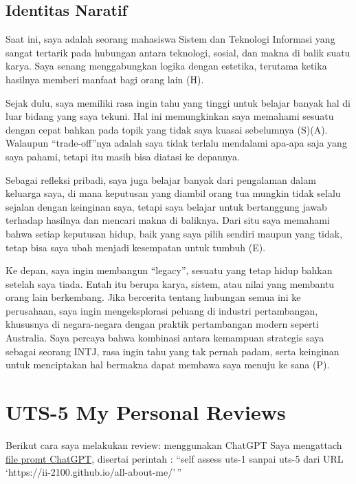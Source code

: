 \documentclass[
  letterpaper,
  DIV=11,
  numbers=noendperiod]{scrreprt}
\begin{document}
\section{Identitas Naratif}\label{identitas-naratif}

Saat ini, saya adalah seorang mahasiswa Sistem dan Teknologi Informasi
yang sangat tertarik pada hubungan antara teknologi, sosial, dan makna
di balik suatu karya. Saya senang menggabungkan logika dengan estetika,
terutama ketika hasilnya memberi manfaat bagi orang lain (H).

Sejak dulu, saya memiliki rasa ingin tahu yang tinggi untuk belajar
banyak hal di luar bidang yang saya tekuni. Hal ini memungkinkan saya
memahami sesuatu dengan cepat bahkan pada topik yang tidak saya kuasai
sebelumnya (S)(A). Walaupun ``trade-off''nya adalah saya tidak terlalu
mendalami apa-apa saja yang saya pahami, tetapi itu masih bisa diatasi
ke depannya.

Sebagai refleksi pribadi, saya juga belajar banyak dari pengalaman dalam
keluarga saya, di mana keputusan yang diambil orang tua mungkin tidak
selalu sejalan dengan keinginan saya, tetapi saya belajar untuk
bertanggung jawab terhadap hasilnya dan mencari makna di baliknya. Dari
situ saya memahami bahwa setiap keputusan hidup, baik yang saya pilih
sendiri maupun yang tidak, tetap bisa saya ubah menjadi kesempatan untuk
tumbuh (E).

Ke depan, saya ingin membangun ``legacy'', sesuatu yang tetap hidup
bahkan setelah saya tiada. Entah itu berupa karya, sistem, atau nilai
yang membantu orang lain berkembang. Jika bercerita tentang hubungan
semua ini ke perusahaan, saya ingin mengeksplorasi peluang di industri
pertambangan, khususnya di negara-negara dengan praktik pertambangan
modern seperti Australia. Saya percaya bahwa kombinasi antara kemampuan
strategis saya sebagai seorang INTJ, rasa ingin tahu yang tak pernah
padam, serta keinginan untuk menciptakan hal bermakna dapat membawa saya
menuju ke sana (P).


\chapter{UTS-5 My Personal Reviews}\label{uts-5-my-personal-reviews}

Berikut cara saya melakukan review: menggunakan ChatGPT Saya mengattach
\href{skor_uts.pdf}{file promt ChatGPT}, disertai perintah : ``self
assess uts-1 sanpai uts-5 dari URL
`https://ii-2100.github.io/all-about-me/'\,''
\end{document}
